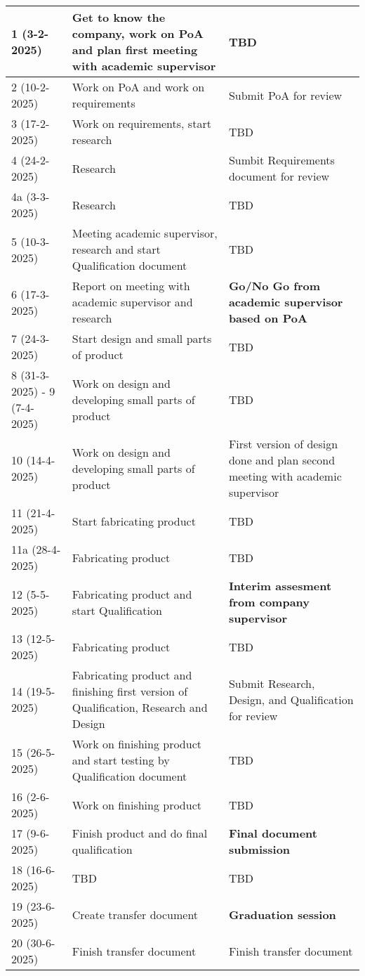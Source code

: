 \documentclass{article}
\begin{document}
\begin{longtable}{|l|p{}|p{}|}
    1 (3-2-2025)  & Get to know the company, work on PoA and plan first meeting with academic supervisor & TBD \\ \hline
    2 (10-2-2025)  & Work on PoA and work on requirements & Submit PoA for review \\ \hline
    3 (17-2-2025)  & Work on requirements, start research & TBD \\ \hline
    4 (24-2-2025)  & Research & Sumbit Requirements document for review \\ \hline
    4a (3-3-2025)  & Research & TBD \\ \hline
    5 (10-3-2025)  & Meeting academic supervisor, research and start Qualification document & TBD \\ \hline
    6 (17-3-2025) & Report on meeting with academic supervisor and research & \textbf{Go/No Go from academic supervisor based on PoA} \\ \hline
    7 (24-3-2025) & Start design and small parts of product & TBD \\ \hline
    8 (31-3-2025) - 9 (7-4-2025) & Work on design and developing small parts of product & TBD \\ \hline
    10 (14-4-2025) & Work on design and developing small parts of product & First version of design done and plan second meeting with academic supervisor \\ \hline
    11 (21-4-2025) & Start fabricating product & TBD \\ \hline
    11a (28-4-2025) & Fabricating product & TBD \\ \hline
    12 (5-5-2025) & Fabricating product and start Qualification & \textbf{Interim assesment from company supervisor} \\ \hline
    13 (12-5-2025) & Fabricating product & TBD \\ \hline
    14 (19-5-2025) & Fabricating product and finishing first version of Qualification, Research and Design & Submit Research, Design, and Qualification for review \\ \hline
    15 (26-5-2025) & Work on finishing product and start testing by Qualification document & TBD \\ \hline
    16 (2-6-2025) & Work on finishing product & TBD \\ \hline
    17 (9-6-2025) & Finish product and do final qualification & \textbf{Final document submission} \\ \hline
    18 (16-6-2025) & TBD & TBD \\ \hline
    19 (23-6-2025) & Create transfer document & \textbf{Graduation session} \\ \hline
    20 (30-6-2025) & Finish transfer document & Finish transfer document \\ \hline
\end{longtable}
\newpage
\end{document}
